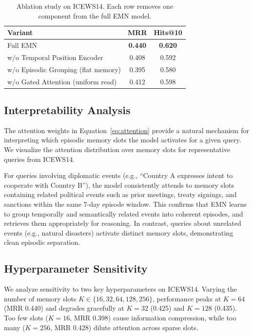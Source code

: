 \documentclass{article}
\begin{document}
\begin{table}[t]
\centering
\caption{Ablation study on ICEWS14. Each row removes one component from the full EMN model.}
\label{tab:ablation}
\begin{tabular}{lcc}
\toprule
Variant & MRR & Hits@10 \\
\midrule
Full EMN & \textbf{0.440} & \textbf{0.620} \\
w/o Temporal Position Encoder & 0.408 & 0.592 \\
w/o Episodic Grouping (flat memory) & 0.395 & 0.580 \\
w/o Gated Attention (uniform read) & 0.412 & 0.598 \\
\bottomrule
\end{tabular}
\end{table}

\subsection{Interpretability Analysis}
\label{sec:analysis:interp}

The attention weights in Equation~\ref{eq:attention} provide a natural mechanism for interpreting which episodic memory slots the model activates for a given query. We visualize the attention distribution over memory slots for representative queries from ICEWS14.

For queries involving diplomatic events (e.g., ``Country A expresses intent to cooperate with Country B''), the model consistently attends to memory slots containing related political events such as prior meetings, treaty signings, and sanctions within the same 7-day episode window. This confirms that EMN learns to group temporally and semantically related events into coherent episodes, and retrieves them appropriately for reasoning. In contrast, queries about unrelated events (e.g., natural disasters) activate distinct memory slots, demonstrating clean episodic separation.

\subsection{Hyperparameter Sensitivity}
\label{sec:analysis:hyper}

We analyze sensitivity to two key hyperparameters on ICEWS14. Varying the number of memory slots $K \in \{16, 32, 64, 128, 256\}$, performance peaks at $K = 64$ (MRR 0.440) and degrades gracefully at $K = 32$ (0.425) and $K = 128$ (0.435). Too few slots ($K = 16$, MRR 0.398) cause information compression, while too many ($K = 256$, MRR 0.428) dilute attention across sparse slots.
\end{document}
